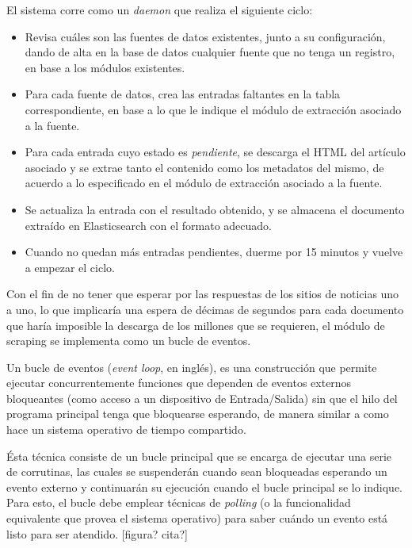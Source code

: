 El sistema corre como un \textit{daemon} que realiza el siguiente ciclo:

\begin{itemize}

\item Revisa cuáles son las fuentes de datos existentes, junto a su configuración, dando de alta en
la base de datos cualquier fuente que no tenga un registro, en base a los módulos existentes.

\item Para cada fuente de datos, crea las entradas faltantes en la tabla correspondiente, en base a
lo que le indique el módulo de extracción asociado a la fuente.

\item Para cada entrada cuyo estado es \textit{pendiente}, se descarga el HTML del artículo asociado
y se extrae tanto el contenido como los metadatos del mismo, de acuerdo a lo especificado en el
módulo de extracción asociado a la fuente.

\item Se actualiza la entrada con el resultado obtenido, y se almacena el documento extraído en
Elasticsearch con el formato adecuado.

\item Cuando no quedan más entradas pendientes, duerme por 15 minutos y vuelve a empezar el ciclo.

\end{itemize}

Con el fin de no tener que esperar por las respuestas de los sitios de noticias uno a uno, lo que
implicaría una espera de décimas de segundos para cada documento que haría imposible la descarga de
los millones que se requieren, el módulo de scraping se implementa como un bucle de eventos.

Un bucle de eventos (\textit{event loop}, en inglés), es una construcción que permite ejecutar
concurrentemente funciones que dependen de eventos externos bloqueantes (como acceso a un
dispositivo de Entrada/Salida) sin que el hilo del programa principal tenga que bloquearse
esperando, de manera similar a como hace un sistema operativo de tiempo compartido.

Ésta técnica consiste de un bucle principal que se encarga de ejecutar una serie de corrutinas, las
cuales se suspenderán cuando sean bloqueadas esperando un evento externo y continuarán su ejecución
cuando el bucle principal se lo indique. Para esto, el bucle debe emplear técnicas de
\textit{polling} (o la funcionalidad equivalente que provea el sistema operativo) para saber cuándo
un evento está listo para ser atendido. [figura? cita?]

